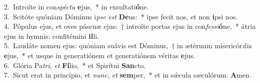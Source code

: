 {2.~}Introíte in con\textit{spé}\textit{ctu} \textbf{e}jus,~* in exsultati\textbf{ó}ne.\\
{3.~}Scitóte quóniam Dóminus i\textit{pse} \textit{est} \textbf{De}us:~* ipse fecit nos, et non \textbf{i}psi nos.\\
{4.~}Pópulus ejus, et oves páscuæ ejus:~† introíte portas ejus in con\textit{fes}\textit{si}\textbf{ó}ne,~* átria ejus in hymnis: confitémini \textbf{il}li.\\
{5.~}Laudáte nomen ejus: quóniam suávis est Dóminus,~† in ætérnum misericór\textit{di}\textit{a} \textbf{e}jus,~* et usque in generatiónem et generatiónem véritas \textbf{e}jus.\\
{6.~}Glória Pa\textit{tri}, \textit{et} \textbf{Fí}lio,~* et Spirítui \textbf{San}cto.\\
{7.~}Sicut erat in princípio, et \textit{nunc}, \textit{et} \textbf{sem}per,~* et in sǽcula sæculórum. \textbf{A}men.\\
